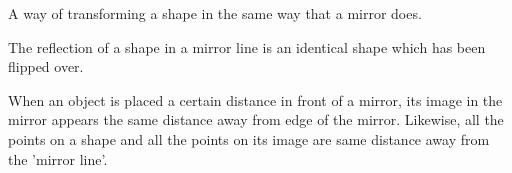 A way of transforming a shape in the same way that a mirror does.
\par
The reflection of a shape in a mirror line is an identical shape which has been 
flipped over.
\par
When an object is placed a certain distance in front of a mirror, its image in the 
mirror appears the same distance away from edge of the mirror.  Likewise, all the 
points on a shape and all the points on its image are same distance away from 
the 'mirror line'.